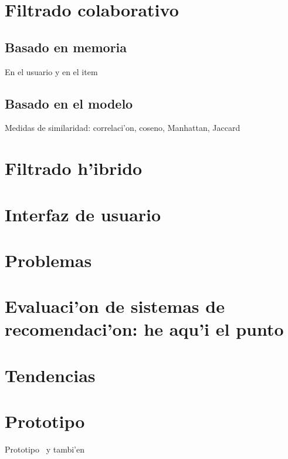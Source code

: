 \documentclass[11pt]{article}
\begin{document}
\section{Filtrado colaborativo}

\subsection{Basado en memoria} En el usuario y en el item

\subsection{Basado en el modelo}
Medidas de similaridad: correlaci'on, coseno, Manhattan, Jaccard

\section{Filtrado h'ibrido}

\section{Interfaz de usuario}

\section{Problemas}

\section{Evaluaci'on de sistemas de recomendaci'on: he aqu'i el punto}

\section{Tendencias}

\section{Prototipo}
Prototipo~\cite{rep1:isra} y tambi'en~\cite{rep2:isra}





\end{document}
